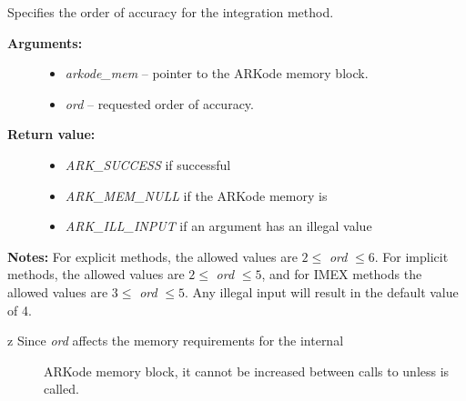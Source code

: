 \documentclass[letterpaper,10pt,english]{sphinxmanual}
\begin{document}

\begin{fulllineitems}
\label{c_interface/User_callable:ARKodeSetOrder}
Specifies the order of accuracy for the integration method.
\begin{description}
\item[{\textbf{Arguments:}}] \leavevmode\begin{itemize}
\item {} 
\emph{arkode\_mem} -- pointer to the ARKode memory block.

\item {} 
\emph{ord} -- requested order of accuracy.

\end{itemize}

\item[{\textbf{Return value:}}] \leavevmode\begin{itemize}
\item {} 
\emph{ARK\_SUCCESS} if successful

\item {} 
\emph{ARK\_MEM\_NULL} if the ARKode memory is 

\item {} 
\emph{ARK\_ILL\_INPUT} if an argument has an illegal value

\end{itemize}

\end{description}

\textbf{Notes:} For explicit methods, the allowed values are $2 \le$
\emph{ord} $\le 6$.  For implicit methods, the allowed values are
$2\le$ \emph{ord} $\le 5$, and for IMEX methods the allowed
values are $3 \le$ \emph{ord} $\le 5$.  Any illegal input
will result in the default value of 4.

\end{fulllineitems}

\begin{description}
\item[{z   Since \emph{ord} affects the memory requirements for the internal}] \leavevmode
ARKode memory block, it cannot be increased between calls to
{\hyperref[c_interface/User_callable:ARKode]{}} unless {\hyperref[c_interface/User_callable:ARKodeReInit]{}} is called.

\end{description}
\end{document}
